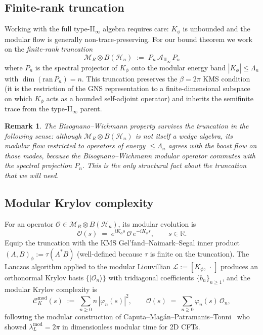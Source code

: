 \documentclass[12pt,a4paper]{article}
\newtheorem{remark}{Remark}
\begin{document}
\subsection{Finite-rank truncation}

Working with the full type-II$_\infty$ algebra requires care: $K_\phi$
is unbounded and the modular flow is generally non-trace-preserving.
For our bound theorem we work on the \emph{finite-rank truncation}
\begin{equation}
  \mathcal{M}_R \otimes B(\mathcal{H}_n)
  \;:=\;
  P_n \,\mathcal{A}_{\mathrm{II}_\infty}\, P_n
  \label{eq:truncation}
\end{equation}
where $P_n$ is the spectral projector of $K_\phi$ onto the modular
energy band $|K_\phi| \le \Lambda_n$ with $\dim(\mathrm{ran}\,P_n) = n$.
This truncation preserves the $\beta = 2\pi$ KMS condition (it is the
restriction of the GNS representation to a finite-dimensional subspace
on which $K_\phi$ acts as a bounded self-adjoint operator) and inherits
the semifinite trace from the type-II$_\infty$ parent.

\begin{remark}\label{rem:bw-truncation}
The Bisognano--Wichmann property survives the truncation in the
following sense: although $\mathcal{M}_R \otimes B(\mathcal{H}_n)$ is
not itself a wedge algebra, its modular flow restricted to operators
of energy $\le \Lambda_n$ agrees with the boost flow on those modes,
because the Bisognano--Wichmann modular operator commutes with the
spectral projection $P_n$.
This is the only structural fact about the truncation that we will
need.
\end{remark}

\subsection{Modular Krylov complexity}

For an operator $\mathcal{O} \in \mathcal{M}_R \otimes B(\mathcal{H}_n)$,
its modular evolution is
\begin{equation}
  \mathcal{O}(s) \;=\; e^{i K_\phi s}\,\mathcal{O}\,e^{-i K_\phi s},
  \qquad s \in \mathbb{R}.
  \label{eq:modular-flow}
\end{equation}
Equip the truncation with the KMS Gel'fand--Naimark--Segal inner product
$(A,B)_\phi := \tau(A^* B)$ (well-defined because $\tau$ is finite on
the truncation).
The Lanczos algorithm applied to the modular Liouvillian
$\mathcal{L} := [K_\phi,\,\cdot\,]$ produces an orthonormal Krylov
basis $\{|\mathcal{O}_n\rangle\}$ with tridiagonal coefficients
$\{b_n\}_{n\ge 1}$, and the modular Krylov complexity is
\begin{equation}
  \mathcal{C}_K^{\mathrm{mod}}(s)
  \;:=\;
  \sum_{n\ge 0} n\,|\varphi_n(s)|^2,
  \qquad
  \mathcal{O}(s) \;=\; \sum_{n\ge 0}\varphi_n(s)\,\mathcal{O}_n,
\end{equation}
following the modular construction of Caputa--Mag\'{a}n--Patramanis--Tonni~\cite{Caputa2024}
who showed $\lambda^{\mathrm{mod}}_L = 2\pi$ in dimensionless modular
time for 2D CFTs.
\end{document}
